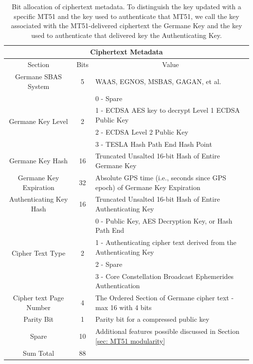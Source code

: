 \documentclass[letterpaper,times]{IONconf/IONconf}
\begin{document}
\begin{table}[H]
\center
\begin{tabular}{|c|c|l|} \hline
	\multicolumn{3}{|c|}{Ciphertext Metadata} \\ \hline
	Section & Bits & \multicolumn{1}{|c|}{Value} \\ \hline
	Germane SBAS System & 5 & WAAS, EGNOS, MSBAS, GAGAN, et al. \\ \hline
	\multirow{4}{*}{Germane Key Level} & \multirow{4}{*}{2} & 0 - Spare \\ 
	& & 1 - ECDSA AES key to decrypt Level 1 ECDSA Public Key \\
	& & 2 - ECDSA Level 2 Public Key \\
	& & 3 - TESLA Hash Path End Hash Point \\ \hline
	Germane Key Hash & 16 & Truncated Unsalted 16-bit Hash of Entire Germane Key \\ \hline
	Germane Key Expiration & 32 & Absolute GPS time (i.e., seconds since GPS epoch) of Germane Key Expiration \\ \hline
	Authenticating Key Hash & 16 & Truncated Unsalted 16-bit Hash of Entire Authenticating Key \\ \hline
	\multirow{4}{*}{Cipher Text Type} & \multirow{4}{*}{2} & 0 - Public Key, AES Decryption Key, or Hash Path End \\
	& & 1 - Authenticating cipher text derived from the Authenticating Key \\ 
	& & 2 - Spare \\ 
	& & 3 - Core Constellation Broadcast Ephemerides Authentication \\ \hline
	Cipher text Page Number & 4 & The Ordered Section of Germane cipher text - max 16 with 4 bits\\ \hline
	Parity Bit & 1 & Parity bit for a compressed public key \\ \hline
	Spare & 10 & Additional features possible discussed in Section \ref{sec: MT51 modularity} \\ \hline
	Sum Total & 88 & \\ \hline
\end{tabular}
\caption{Bit allocation of ciphertext metadata. To distinguish the key updated with a specific MT51 and the key used to authenticate that MT51, we call the key associated with the MT51-delivered ciphertext the Germane Key and the key used to authenticate that delivered key the Authenticating Key.}
\label{tab: meta-data table}
\end{table}
\end{document}

